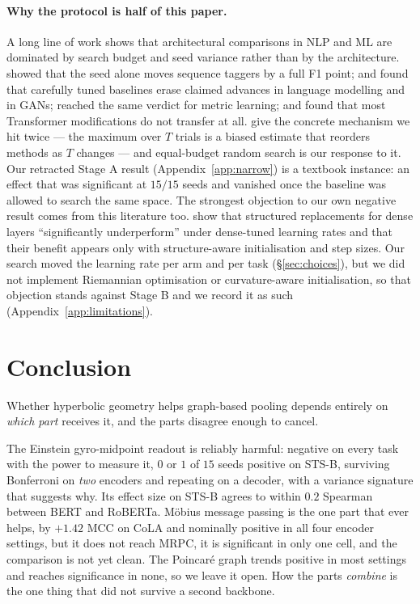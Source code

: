 \documentclass{article}
\begin{document}
\paragraph{Why the protocol is half of this paper.} A long line of work shows
that architectural comparisons in NLP and ML are dominated by search budget and
seed variance rather than by the architecture. \citet{reimers2017scoredistributions}
showed that the seed alone moves sequence taggers by a full F1 point;
\citet{melis2018stateoftheart} and \citet{lucic2018gans} found that
carefully tuned baselines erase claimed advances in language modelling and in
GANs; \citet{musgrave2020realitycheck} reached the same verdict for metric
learning; and \citet{narang2021modifications} found that most Transformer
modifications do not transfer at all. \citet{dodge2019showyourwork} give the
concrete mechanism we hit twice --- the maximum over $T$ trials is a biased
estimate that reorders methods as $T$ changes --- and equal-budget random search
\citep{bergstra2012randomsearch} is our response to it. Our retracted Stage A
result (Appendix~\ref{app:narrow}) is a textbook instance: an effect that was
significant at $15/15$ seeds and vanished once the baseline was allowed to
search the same space. The strongest objection to our own negative result comes
from this literature too. \citet{qiu2024computebetterspent} show that structured
replacements for dense layers ``significantly underperform'' under dense-tuned
learning rates and that their benefit appears only with structure-aware
initialisation and step sizes. Our search moved the learning rate per arm and
per task (\S\ref{sec:choices}), but we did not implement Riemannian
optimisation or curvature-aware initialisation, so that objection stands
against Stage B and we record it as such (Appendix~\ref{app:limitations}).

\section{Conclusion}

Whether hyperbolic geometry helps graph-based pooling depends entirely on
\emph{which part} receives it, and the parts disagree enough to cancel.

The Einstein gyro-midpoint readout is reliably harmful: negative on every task
with the power to measure it, $0$ or $1$ of $15$ seeds positive on STS-B,
surviving Bonferroni on \emph{two} encoders and repeating on a decoder, with a
variance signature that suggests why. Its effect size on STS-B agrees to within
$0.2$ Spearman between BERT and RoBERTa. M\"obius message passing is the one
part that ever helps, by $+1.42$ MCC on CoLA and nominally positive in all four
encoder settings, but it does not reach MRPC, it is significant in only one
cell, and the comparison is not yet clean. The Poincar\'e graph trends positive
in most settings and reaches significance in none, so we leave it open. How the
parts \emph{combine} is the one thing that did not survive a second backbone.
\end{document}
